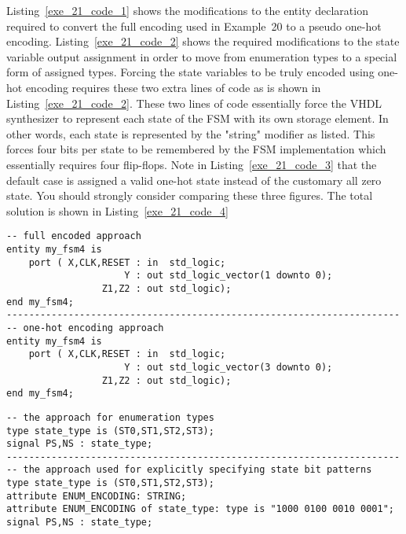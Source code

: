 Listing~\ref{exe_21_code_1} shows the modifications to the entity declaration required to convert the full encoding used in Example~20 to a pseudo one-hot encoding. Listing~\ref{exe_21_code_2} shows the required modifications to the state variable output assignment in order to move from enumeration types to a special form of assigned types. Forcing the state variables to be truly encoded using one-hot encoding requires these two extra lines of code as is shown in Listing~\ref{exe_21_code_2}. These two lines of code essentially force the VHDL synthesizer to represent each state of the FSM with its own storage element. In other words, each state is represented by the "string" modifier as listed. This forces four bits per state to be remembered by the FSM implementation which essentially requires four flip-flops. Note in Listing~\ref{exe_21_code_3} that the default case is assigned a valid one-hot state instead of the customary all zero state. You should strongly consider comparing these three figures. The total solution is shown in Listing~\ref{exe_21_code_4}

\noindent
\begin{minipage}{0.99\linewidth}
\begin{lstlisting}[label=exe_21_code_1, caption=Modifications to convert Example~20 to one-hot encoding.]
-- full encoded approach
entity my_fsm4 is
    port ( X,CLK,RESET : in  std_logic;
                     Y : out std_logic_vector(1 downto 0);
                 Z1,Z2 : out std_logic);
end my_fsm4;
----------------------------------------------------------------------
-- one-hot encoding approach
entity my_fsm4 is
    port ( X,CLK,RESET : in  std_logic;
                     Y : out std_logic_vector(3 downto 0);
                 Z1,Z2 : out std_logic);
end my_fsm4;
\end{lstlisting}

\begin{lstlisting}[label=exe_21_code_2, caption=Modifications to convert state variables to use one-hot encoding.]
-- the approach for enumeration types
type state_type is (ST0,ST1,ST2,ST3);
signal PS,NS : state_type;
----------------------------------------------------------------------
-- the approach used for explicitly specifying state bit patterns
type state_type is (ST0,ST1,ST2,ST3);
attribute ENUM_ENCODING: STRING;
attribute ENUM_ENCODING of state_type: type is "1000 0100 0010 0001";
signal PS,NS : state_type;
\end{lstlisting}
\end{minipage}

